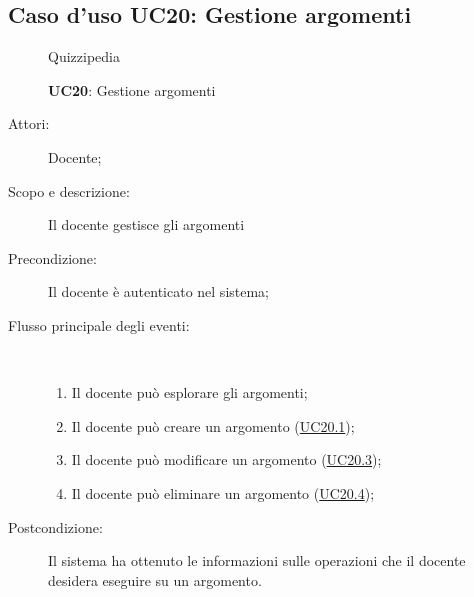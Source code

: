 \subsection{Caso d'uso UC20: Gestione argomenti}
\begin{figure}[H]
	\centering
	\begin{resizedtikzpicture}{\textwidth}
		\begin{umlsystem}[x=0, fill=lightgray!20]{Quizzipedia}
		\end{umlsystem}
	\end{resizedtikzpicture}
	\caption{\textbf{UC20}: Gestione argomenti}
	\label{UC20}
\end{figure}
\begin{description}
	\item[Attori:] Docente;
	\item[Scopo e descrizione:] Il docente gestisce gli argomenti
	\item[Precondizione:] Il docente è autenticato nel sistema;
	
	\item[Flusso principale degli eventi:] \ 
	\begin{enumerate}
		\item Il docente può esplorare gli argomenti;
		\item Il docente può creare un argomento (\hyperlink{UC20.1}{UC20.1});
		\item Il docente può modificare un argomento (\hyperlink{UC20.3}{UC20.3});
		\item Il docente può eliminare un argomento (\hyperlink{UC20.4}{UC20.4});
		
	\end{enumerate}
	\item[Postcondizione:] Il sistema ha ottenuto le informazioni sulle operazioni che il docente desidera eseguire su un argomento.
\end{description}
\hypertarget{UC20.1}{}
